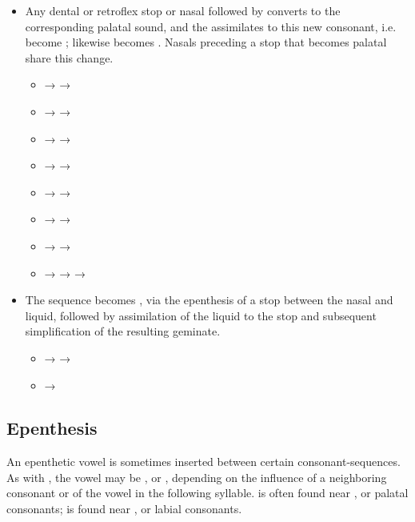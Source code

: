 \begin{itemize}
	\item Any dental or retroflex stop or nasal followed by  converts to the corresponding palatal sound, and the  assimilates to this new consonant, i.e.  become ; likewise  becomes . Nasals preceding a stop that becomes palatal share this change.
		\begin{itemize}
			\item {} →  → 
			\item {} →  → 
			\item {} →  → 
			\item {} →  → 
			\item {} →  → 
			\item {} →  → 
			\item {} →  → 
			\item {} →  →  → 
		\end{itemize}
	\item The sequence  becomes , via the epenthesis of a stop between the nasal and liquid, followed by assimilation of the liquid to the stop and subsequent simplification of the resulting geminate.
		\begin{itemize}
			\item {} →  → 
			\item {} → 
		\end{itemize}
\end{itemize}

\subsection{Epenthesis}

An epenthetic vowel is sometimes inserted between certain consonant-sequences. As with , the vowel may be , or , depending on the influence of a neighboring consonant or of the vowel in the following syllable.  is often found near , or palatal consonants;  is found near , or labial consonants.

